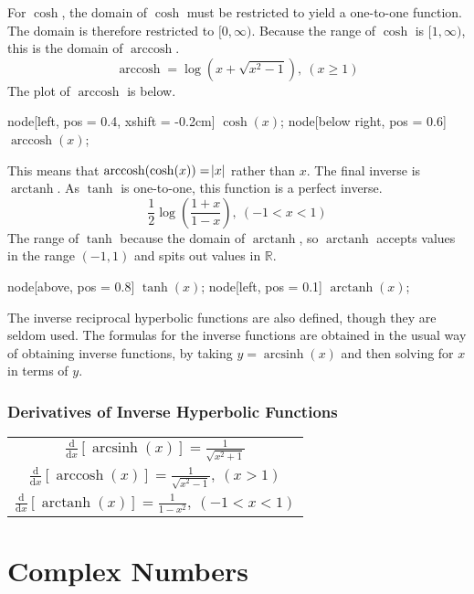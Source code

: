 \documentclass[12pt]{report}
\newenvironment{formulalist}{
    \renewcommand{\arraystretch}{2}
    \begin{center}    
        \begin{tabular}{||c||}
}{
        \end{tabular}
    \end{center}
    \renewcommand{\arraystretch}{1}
}
\newcommand{\R}{\mathbb{R}}
\newcommand{\derivx}[1]{\frac{\mathrm{d}}{\mathrm{d}x}\left[#1\right]}
\DeclareMathOperator{\arcsinh}{arcsinh}
\DeclareMathOperator{\arccosh}{arccosh}
\DeclareMathOperator{\arctanh}{arctanh}
\begin{document}
\begin{flushleft}
For \(\cosh\), the domain of \(\cosh\) must be restricted to yield a one-to-one
function. The domain is therefore restricted to \([0, \infty)\). Because the 
range of \(\cosh\) is \([1, \infty)\), this is the domain of \(\arccosh\).
\[\arccosh = \log(x + \sqrt{x^2 - 1}), \:(x \geq 1)\]
The plot of \(\arccosh\) is below.

\begin{plot}
    node[left, pos = 0.4, xshift = -0.2cm] {\(\cosh(x)\)};
    node[below right, pos = 0.6] {\(\arccosh(x)\)};
\end{plot}

This means that \(\arccosh(\cosh(x)) = \abs{x}\) rather than \(x\). The final
inverse is \(\arctanh\). As \(\tanh\) is one-to-one, this function is a perfect
inverse.
\[\frac{1}{2}\log\left(\frac{1 + x}{1 - x}\right), \:(-1 < x < 1)\]
The range of \(\tanh\) because the domain of \(\arctanh\), so \(\arctanh\)
accepts values in the range \((-1, 1)\) and spits out values in \(\R\).

\begin{plot}
    node[above, pos = 0.8] {\(\tanh(x)\)};
    node[left, pos = 0.1] {\(\arctanh(x)\)};
\end{plot}

The inverse reciprocal hyperbolic functions are also defined, though they are 
seldom used. The formulas for the inverse functions are obtained in the usual
way of obtaining inverse functions, by taking \(y = \arcsinh(x)\) and then 
solving for \(x\) in terms of \(y\).

\subsubsection*{Derivatives of Inverse Hyperbolic Functions}

\begin{formulalist}
    \(\derivx{\arcsinh(x)} = \frac{1}{\sqrt{x^2 + 1}}\) \\
    \(\derivx{\arccosh(x)} = \frac{1}{\sqrt{x^2 - 1}}, \:(x > 1)\) \\
    \(\derivx{\arctanh(x)} = \frac{1}{1 - x^2}, \:(-1 < x < 1)\) \\
\end{formulalist}

\section*{Complex Numbers}


\end{flushleft}
\end{document}
